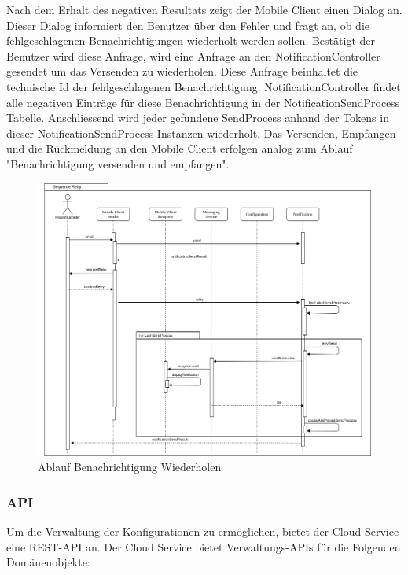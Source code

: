Nach dem Erhalt des negativen Resultats zeigt der Mobile Client einen Dialog an.
Dieser Dialog informiert den Benutzer über den Fehler und fragt an, ob die fehlgeschlagenen Benachrichtigungen wiederholt werden sollen.
Bestätigt der Benutzer wird diese Anfrage, wird eine Anfrage an den NotificationController gesendet um das Versenden zu wiederholen.
Diese Anfrage beinhaltet die technische Id der fehlgeschlagenen Benachrichtigung.
NotificationController findet alle negativen Einträge für diese Benachrichtigung in der NotificationSendProcess Tabelle.
Anschliessend wird jeder gefundene SendProcess anhand der Tokens in dieser NotificationSendProcess Instanzen wiederholt.
Das Versenden, Empfangen und die Rückmeldung an den Mobile Client erfolgen analog zum Ablauf "Benachrichtigung versenden und empfangen".

\begin{figure}[h]
    \centering
    \begin{minipage}[b]{0.9\textwidth}
        \includegraphics[width=\textwidth]{graphics/Sequence_Notification_Retry}
        \caption{Ablauf Benachrichtigung Wiederholen}
    \end{minipage}
\end{figure}


\clearpage

\subsubsection{API}

Um die Verwaltung der Konfigurationen zu ermöglichen, bietet der Cloud Service eine REST-API an.
Der Cloud Service bietet Verwaltungs-APIs für die Folgenden Domänenobjekte:

